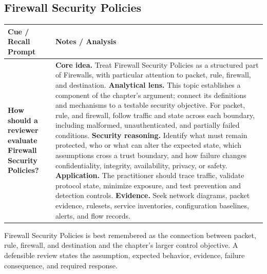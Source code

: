 \documentclass[11pt]{article}
\newcommand{\CornellHeader}{%
\rowcolor{Navy}\color{white}\bfseries Cue / Recall Prompt & \color{white}\bfseries Notes / Analysis\\\hline}
\newcommand{\CornellRow}[2]{%
\cellcolor{CueGray}\RaggedRight\textbf{#1} & \RaggedRight #2\\\hline}
\begin{document}
\subsection*{Firewall Security Policies}
\begin{longtable}{>{\RaggedRight\arraybackslash}p{}|>{\RaggedRight\arraybackslash}p{}}
\CornellHeader
\CornellRow{How should a reviewer evaluate Firewall Security Policies?}{\textbf{Core idea.} Treat Firewall Security Policies as a structured part of Firewalls, with particular attention to packet, rule, firewall, and destination. \textbf{Analytical lens.} This topic establishes a component of the chapter's argument; connect its definitions and mechanisms to a testable security objective. For packet, rule, and firewall, follow traffic and state across each boundary, including malformed, unauthenticated, and partially failed conditions. \textbf{Security reasoning.} Identify what must remain protected, who or what can alter the expected state, which assumptions cross a trust boundary, and how failure changes confidentiality, integrity, availability, privacy, or safety. \textbf{Application.} The practitioner should trace traffic, validate protocol state, minimize exposure, and test prevention and detection controls. \textbf{Evidence.} Seek network diagrams, packet evidence, rulesets, service inventories, configuration baselines, alerts, and flow records.}
\end{longtable}
\begin{topicsummary}
Firewall Security Policies is best remembered as the connection between packet, rule, firewall, and destination and the chapter's larger control objective. A defensible review states the assumption, expected behavior, evidence, failure consequence, and required response.
\end{topicsummary}
\end{document}
